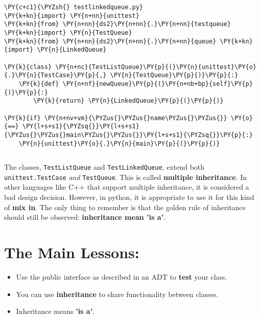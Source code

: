 \begin{Verbatim}
\end{Verbatim}


\begin{Verbatim}[commandchars=\\\{\}]
\PY{c+c1}{\PYZsh{} testlinkedqueue.py}
\PY{k+kn}{import} \PY{n+nn}{unittest}
\PY{k+kn}{from} \PY{n+nn}{ds2}\PY{n+nn}{.}\PY{n+nn}{testqueue} \PY{k+kn}{import} \PY{n}{TestQueue}
\PY{k+kn}{from} \PY{n+nn}{ds2}\PY{n+nn}{.}\PY{n+nn}{queue} \PY{k+kn}{import} \PY{n}{LinkedQueue}

\PY{k}{class} \PY{n+nc}{TestListQueue}\PY{p}{(}\PY{n}{unittest}\PY{o}{.}\PY{n}{TestCase}\PY{p}{,} \PY{n}{TestQueue}\PY{p}{)}\PY{p}{:}
    \PY{k}{def} \PY{n+nf}{newQueue}\PY{p}{(}\PY{n+nb+bp}{self}\PY{p}{)}\PY{p}{:}
        \PY{k}{return} \PY{n}{LinkedQueue}\PY{p}{(}\PY{p}{)}

\PY{k}{if} \PY{n+nv+vm}{\PYZus{}\PYZus{}name\PYZus{}\PYZus{}} \PY{o}{==} \PY{l+s+s1}{\PYZsq{}}\PY{l+s+s1}{\PYZus{}\PYZus{}main\PYZus{}\PYZus{}}\PY{l+s+s1}{\PYZsq{}}\PY{p}{:}
    \PY{n}{unittest}\PY{o}{.}\PY{n}{main}\PY{p}{(}\PY{p}{)}
\end{Verbatim}

\begin{Verbatim}
\end{Verbatim}


The classes, \texttt{TestListQueue} and \texttt{TestLinkedQueue}, extend both \texttt{unittest.TestCase} \emph{and} \texttt{TestQueue}.
This is called \textbf{multiple inheritance}.
In other languages like C++ that support multiple inheritance, it is considered a bad design decision.
However, in python, it is appropriate to use it for this kind of \textbf{mix in}.
The only thing to remember is that the golden rule of inheritance should still be observed: \textbf{inheritance mean 'is a'}.

\section{The Main Lessons:}

\begin{itemize}

\item Use the public interface as described in an ADT to \textbf{test} your class.

\item You can use \textbf{inheritance} to share functionality between classes.

\item Inheritance means \textbf{'is a'}.

\end{itemize}
